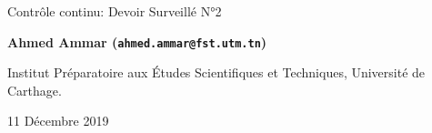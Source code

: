 \documentclass[%
oneside,                 %
final,                   %
10pt,french]{article}
\begin{document}

\newcommand{\exercisesection}[1]{\subsection*{#1}}






\thispagestyle{empty}

\begin{center}
{\LARGE\bf
\begin{spacing}{1.25}
Contrôle continu: Devoir Surveillé N°2
\end{spacing}
}
\end{center}


\begin{center}
{\bf Ahmed Ammar (\texttt{ahmed.ammar@fst.utm.tn})}
\end{center}

    \begin{center}
\centerline{{\small Institut Préparatoire aux Études Scientifiques et Techniques, Université de Carthage.}}
\end{center}
    

\begin{center}
11 Décembre 2019
\end{center}

\vspace{1cm}



\end{document}
